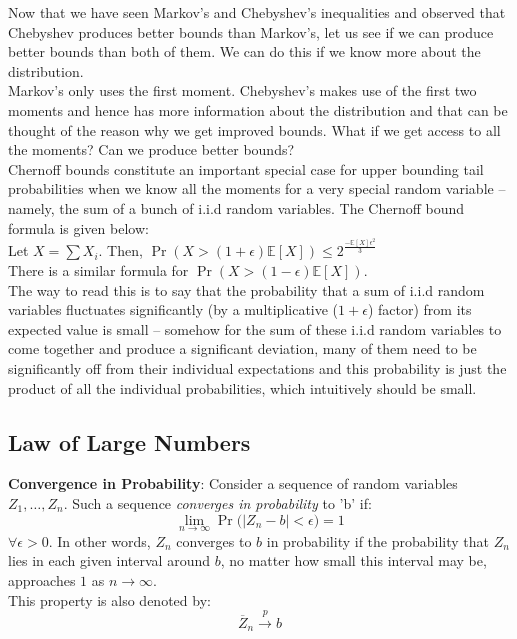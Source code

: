 \documentclass[english, 11pt]{article}
\begin{document}
Now that we have seen Markov's and Chebyshev's inequalities and observed that Chebyshev produces better bounds than Markov's, let us see if we can produce better bounds than both of them. We can do this if we know more about the distribution. \\

Markov's only uses the first moment. Chebyshev's makes use of the first two moments and hence has more information about the distribution and that can be thought of the reason why we get improved bounds. What if we get access to all the moments? Can we produce better bounds? \\

Chernoff bounds constitute an important special case for upper bounding tail probabilities when we know all the moments for a very special random variable -- namely, the sum of a bunch of i.i.d random variables. The Chernoff bound formula is given below: \\

Let $X = \sum X_i$. Then, $\Pr(X > (1 + \epsilon) \mathbb{E}[X] ) \le 2^ {\frac{- \mathbb{E}[X] \epsilon^2}{3}}$ \\
There is a similar formula for $\Pr(X > (1 - \epsilon) \mathbb{E}[X] )$. \\

The way to read this is to say that the probability that a sum of i.i.d random variables fluctuates significantly (by a multiplicative ($1 + \epsilon$) factor) from its expected value is small -- somehow for the sum of these i.i.d random variables to come together and produce a significant deviation, many of them need to be significantly off from their individual expectations and this probability is just the product of all the individual probabilities, which intuitively should be small.


\subsection{Law of Large Numbers}
{\bf Convergence in Probability}: Consider a sequence of random variables $Z_1, \ldots, Z_n$. Such a sequence {\it converges in probability} to 'b' if:
\[ \lim_{n \to \infty} \Pr \bigg( \big| Z_n - b \big| < \epsilon \bigg) = 1 \]
$\forall \epsilon > 0$.
In other words, $Z_n$ converges to $b$ in probability if the probability that $Z_n$ lies in each given interval around $b$, no matter how small this interval may be, approaches $1$ as $n \to \infty$.\\
This property is also denoted by:
\[ \overline{Z}_n \xrightarrow{p} b \]
\end{document}
